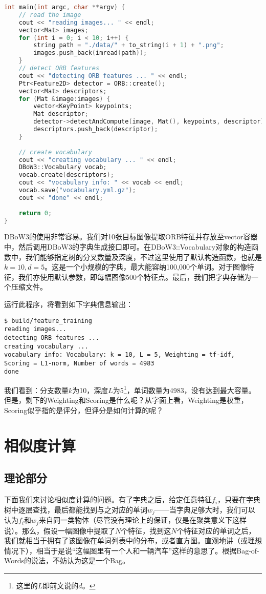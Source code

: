 \begin{lstlisting}[language=c++,caption=slambook2/ch11/feature\_training.cpp]
int main(int argc, char **argv) {
	// read the image 
	cout << "reading images... " << endl;
	vector<Mat> images;
	for (int i = 0; i < 10; i++) {
		string path = "./data/" + to_string(i + 1) + ".png";
		images.push_back(imread(path));
	}
	// detect ORB features
	cout << "detecting ORB features ... " << endl;
	Ptr<Feature2D> detector = ORB::create();
	vector<Mat> descriptors;
	for (Mat &image:images) {
		vector<KeyPoint> keypoints;
		Mat descriptor;
		detector->detectAndCompute(image, Mat(), keypoints, descriptor);
		descriptors.push_back(descriptor);
	}
	
	// create vocabulary 
	cout << "creating vocabulary ... " << endl;
	DBoW3::Vocabulary vocab;
	vocab.create(descriptors);
	cout << "vocabulary info: " << vocab << endl;
	vocab.save("vocabulary.yml.gz");
	cout << "done" << endl;
	
	return 0;
}
\end{lstlisting}
DBoW3的使用非常容易。我们对10张目标图像提取ORB特征并存放至vector容器中，然后调用DBoW3的字典生成接口即可。在DBoW3::Vocabulary对象的构造函数中，我们能够指定树的分叉数量及深度，不过这里使用了默认构造函数，也就是$k=10,d=5$。这是一个小规模的字典，最大能容纳100,000个单词。对于图像特征，我们亦使用默认参数，即每幅图像500个特征点。最后，我们把字典存储为一个压缩文件。

运行此程序，将看到如下字典信息输出：

\begin{lstlisting}
$ build/feature_training
reading images...
detecting ORB features ...
creating vocabulary ...
vocabulary info: Vocabulary: k = 10, L = 5, Weighting = tf-idf, Scoring = L1-norm, Number of words = 4983
done
\end{lstlisting}

我们看到：分支数量$k$为10，深度$L$为5\footnote{这里的$L$即前文说的$d$。}，单词数量为4983，没有达到最大容量。但是，剩下的Weighting和Scoring是什么呢？从字面上看，Weighting是权重，Scoring似乎指的是评分，但评分是如何计算的呢？

\section{相似度计算}
\subsection{理论部分}
下面我们来讨论相似度计算的问题。有了字典之后，给定任意特征$f_i$，只要在字典树中逐层查找，最后都能找到与之对应的单词$w_j$——当字典足够大时，我们可以认为$f_i$和$w_j$来自同一类物体（尽管没有理论上的保证，仅是在聚类意义下这样说）。那么，假设一幅图像中提取了$N$个特征，找到这$N$个特征对应的单词之后，我们就相当于拥有了该图像在单词列表中的分布，或者直方图。直观地讲（或理想情况下），相当于是说“这幅图里有一个人和一辆汽车”这样的意思了。根据Bag-of-Words的说法，不妨认为这是一个Bag。

